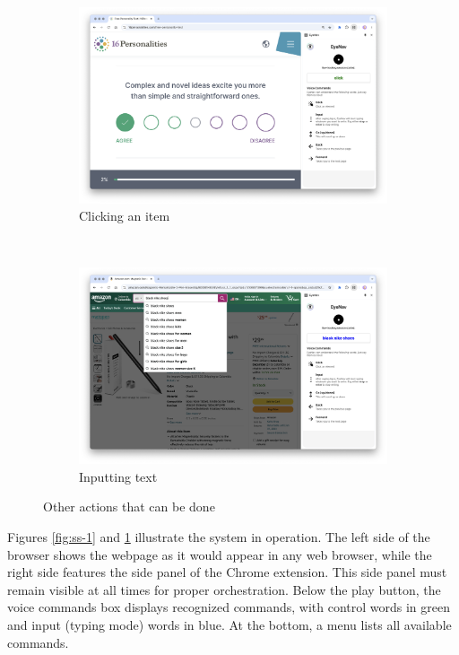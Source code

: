 \begin{figure}[ht]
    \centering
    \begin{subfigure}[ht]{0.48\textwidth}
        \centering
        \includegraphics[width=\textwidth]{images/screenshots/eyenav-click.png}
        \caption{Clicking an item}
    \end{subfigure}
    ~ 
    \begin{subfigure}[ht]{0.48\textwidth}
        \centering
        \includegraphics[width=\textwidth]{images/screenshots/eyenav-input.png}
        \caption{Inputting text}
    \end{subfigure}
    \caption{Other actions that can be done}
    \label{figs:ss-2-3}
\end{figure}

Figures \ref{fig:ss-1} and \ref{figs:ss-2-3} illustrate the system in operation. The left side of the browser shows the webpage as it would appear in any web browser, while the right side features the side panel of the Chrome extension. This side panel must remain visible at all times for proper orchestration. Below the play button, the voice commands box displays recognized commands, with control words in green and input (typing mode) words in blue. At the bottom, a menu lists all available commands.

